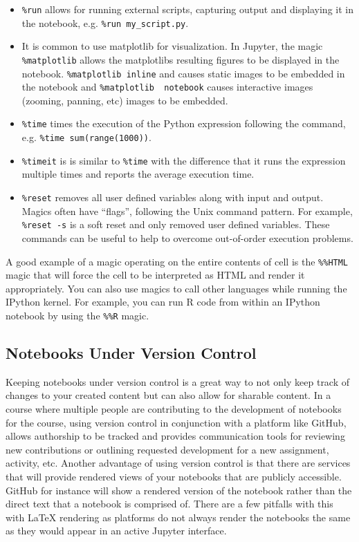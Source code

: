 \documentclass[]{book}
\begin{document}
\begin{itemize}
\item
  \texttt{\%run} allows for running external scripts, capturing output
  and displaying it in the notebook, e.g. \texttt{\%run\ my\_script.py}.
\item
  It is common to use matplotlib for visualization. In Jupyter, the
  magic \texttt{\%matplotlib} allows the matplotlibs resulting figures
  to be displayed in the notebook. \texttt{\%matplotlib\ inline} and
  causes static images to be embedded in the notebook and
  \texttt{\%matplotlib\ \ notebook} causes interactive images (zooming,
  panning, etc) images to be embedded.
\item
  \texttt{\%time} times the execution of the Python expression following
  the command, e.g. \texttt{\%time\ sum(range(1000))}.
\item
  \texttt{\%timeit} is is similar to \texttt{\%time} with the difference
  that it runs the expression multiple times and reports the average
  execution time.
\item
  \texttt{\%reset} removes all user defined variables along with input
  and output. Magics often have ``flags'', following the Unix command
  pattern. For example, \texttt{\%reset\ -s} is a soft reset and only
  removed user defined variables. These commands can be useful to help
  to overcome out-of-order execution problems.
\end{itemize}

A good example of a magic operating on the entire contents of cell is
the \texttt{\%\%HTML} magic that will force the cell to be interpreted
as HTML and render it appropriately. You can also use magics to call
other languages while running the IPython kernel. For example, you can
run R code from within an IPython notebook by using the \texttt{\%\%R}
magic.

\subsection{Notebooks Under Version
Control}\label{notebooks-under-version-control}

Keeping notebooks under version control is a great way to not only keep
track of changes to your created content but can also allow for sharable
content. In a course where multiple people are contributing to the
development of notebooks for the course, using version control in
conjunction with a platform like GitHub, allows authorship to be tracked
and provides communication tools for reviewing new contributions or
outlining requested development for a new assignment, activity, etc.
Another advantage of using version control is that there are services
that will provide rendered views of your notebooks that are publicly
accessible. GitHub for instance will show a rendered version of the
notebook rather than the direct text that a notebook is comprised of.
There are a few pitfalls with this with LaTeX rendering as platforms do
not always render the notebooks the same as they would appear in an
active Jupyter interface.
\end{document}
